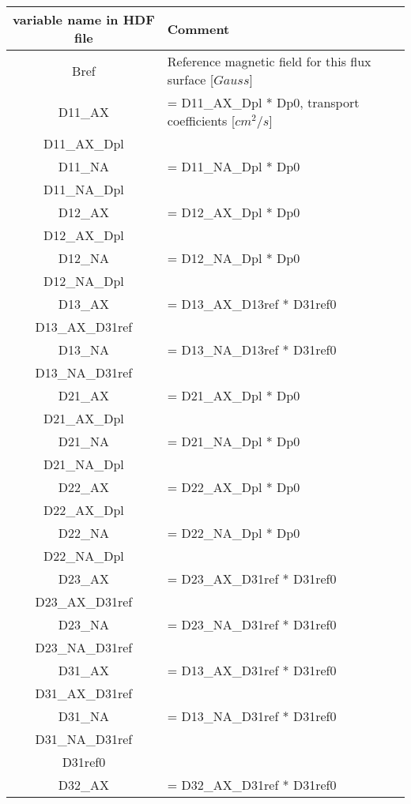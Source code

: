 \begin{table}[h]
\begin{tabular}{|c|l|}
\hline
variable name in HDF file  & Comment
\\
\hline
Bref & Reference magnetic field for this flux surface [$Gauss$] \\
\hline
D11\_AX & = D11\_AX\_Dpl * Dp0, transport coefficients [$cm^2/s$] \\
\hline
D11\_AX\_Dpl & \\
\hline
D11\_NA & = D11\_NA\_Dpl * Dp0 \\
\hline
D11\_NA\_Dpl & \\
\hline
D12\_AX & = D12\_AX\_Dpl * Dp0 \\
\hline
D12\_AX\_Dpl & \\
\hline
D12\_NA & = D12\_NA\_Dpl * Dp0 \\
\hline
D12\_NA\_Dpl & \\
\hline
D13\_AX & = D13\_AX\_D13ref * D31ref0 \\
\hline
D13\_AX\_D31ref & \\
\hline
D13\_NA & = D13\_NA\_D13ref * D31ref0 \\
\hline
D13\_NA\_D31ref & \\
\hline
D21\_AX & = D21\_AX\_Dpl * Dp0 \\
\hline
D21\_AX\_Dpl & \\
\hline
D21\_NA & = D21\_NA\_Dpl * Dp0 \\
\hline
D21\_NA\_Dpl & \\
\hline
D22\_AX & = D22\_AX\_Dpl * Dp0 \\
\hline
D22\_AX\_Dpl & \\
\hline
D22\_NA & = D22\_NA\_Dpl * Dp0 \\
\hline
D22\_NA\_Dpl & \\
\hline
D23\_AX & = D23\_AX\_D31ref * D31ref0 \\
\hline
D23\_AX\_D31ref & \\
\hline
D23\_NA & = D23\_NA\_D31ref * D31ref0 \\
\hline
D23\_NA\_D31ref & \\
\hline
D31\_AX & = D13\_AX\_D31ref * D31ref0 \\
\hline
D31\_AX\_D31ref & \\
\hline
D31\_NA & = D13\_NA\_D31ref * D31ref0 \\
\hline
D31\_NA\_D31ref & \\
\hline
D31ref0 & \\
\hline
D32\_AX & = D32\_AX\_D31ref * D31ref0 \\

\end{tabular}
\end{table}
